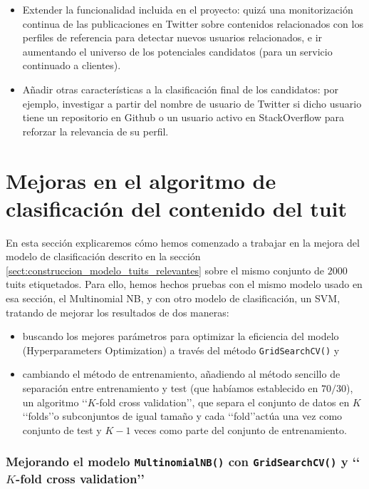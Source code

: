\begin{itemize}
\item Extender la funcionalidad incluida en el proyecto: quizá una monitorización
continua de las publicaciones en Twitter sobre contenidos relacionados con los perfiles de 
referencia para detectar nuevos usuarios relacionados, e ir aumentando el universo de los 
potenciales candidatos (para un servicio continuado a clientes).
\item Añadir otras características a la clasificación final de los candidatos: por ejemplo,
investigar a partir del nombre de usuario de Twitter si dicho usuario tiene un repositorio en 
Github o un usuario activo en StackOverflow para reforzar la relevancia de su perfil.
\end{itemize} 

\section{Mejoras en el algoritmo de clasificación del contenido del tuit}
\label{sect:mejoras_alg_clasificacion_tuit}
En esta sección explicaremos cómo hemos comenzado a trabajar en la mejora del modelo de 
clasificación descrito en la sección \ref{sect:construccion_modelo_tuits_relevantes} sobre
el mismo conjunto de $2000$ tuits etiquetados.
Para ello, hemos hechos pruebas con el mismo modelo usado en esa sección, el Multinomial NB, y con otro modelo de clasificación, un SVM, tratando de mejorar los resultados de dos maneras:
\begin{itemize}
\item buscando los mejores parámetros para optimizar la eficiencia del modelo 
(Hyperparameters Optimization) a través del método {\tt GridSearchCV()} y 
\item cambiando el método de entrenamiento, añadiendo al
método sencillo de separación entre entrenamiento y test (que habíamos establecido en $70/30$), 
un algoritmo \lq\lq $K$-fold cross va\-li\-da\-tion\rq\rq, que separa el conjunto de datos en $K$ 
\lq\lq folds\rq\rq o subconjuntos de igual tamaño y cada \lq\lq fold\rq\rq actúa una vez como 
conjunto de test y $K-1$ veces como parte del conjunto de entrenamiento.
\end{itemize}

\subsubsection{Mejorando el modelo {\tt MultinomialNB()} con {\tt GridSearchCV()}
y \lq\lq $K$-fold cross validation\rq\rq}

